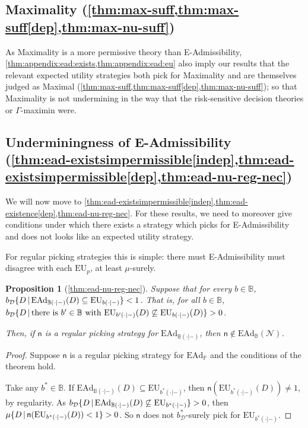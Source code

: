 \documentclass[a4paper]{article}
\newtheorem{proposition}[theorem]{Proposition}
\renewcommand\P{\mathbb{P}} %
\newcommand\EU{\mathrm{EU}}
\newcommand\EAd{\mathrm{EAd}}
\newcommand{\D}{\mathcal{D}}
\newcommand{\Decs}{\mathcal{D}}
\newcommand{\n}{\mathsf{n}}
\renewcommand{\nu}{\n}
\newcommand\Nu{\mathcal{N}}
\newcommand{\IB}{\mathbb{B}}
\newcommand{\IP}{\P}
\renewcommand{\color}[1]{}
\newenvironment{colored}[1]{\leavevmode\color{#1}}{}
\newcommand\SetDelimiter[1][]{
	\nonscript\,#1\vert \allowbreak \nonscript\,\mathopen{}}
\providecommand\given{\SetDelimiter}
\newenvironment{CCM rewritten}
{\begingroup\color{blue}} %
{\endgroup}              %
\begin{document}
\begin{colored}{violet}
\subsection{Maximality (\cref{thm:max-suff,thm:max-suff[dep],thm:max-nu-suff})}
As Maximality is a more permissive theory than E-Admissibility, \cref{thm:appendix:ead:exists,thm:appendix:ead:eu} also imply our results that the relevant expected utility strategies both pick for Maximality and are themselves judged as Maximal (\cref{thm:max-suff,thm:max-suff[dep],thm:max-nu-suff}); so that Maximality is not undermining in the way that the risk-sensitive decision theories or $\Gamma$-maximin were.

\subsection{Underminingness of E-Admissibility \\(\cref{thm:ead-existsimpermissible[indep],thm:ead-existsimpermissible[dep],thm:ead-nu-reg-nec})}\label{sect:appendix:eadundermining}

We will now move to \cref{thm:ead-existsimpermissible[indep],thm:ead-existence[dep],thm:ead-nu-reg-nec}. For these results, we need to moreover give conditions under which there exists a strategy which picks for E-Admissibility and does not looks like an expected utility strategy. 

For regular picking strategies this is simple: there must E-Admissibility must disagree with each $\EU_p$, at least $\mu$-surely.

	\begin{proposition}[\cref{thm:ead-nu-reg-nec}]
	Suppose that for every $b\in\IB$, $b_\D\{D\given \EAd_{\IB(\cdot|-)}(D)\subseteq\EU_{b(\cdot|-)}\}<1$. 
	That is, for all $b\in \IB$, $b_\D\{D\given \text{there is $b'\in\IB$ with }\EU_{b'(\cdot|-)}(D)\not\subseteq\EU_{b(\cdot|-)}(D)\}>0$. 
	
	Then, if $\n$ is a regular picking strategy for $\EAd_{\IB(\cdot|-)}$, then $\n\notin \EAd_\IB(\Nu)$.
\end{proposition}

\begin{proof}
	Suppose $\nu$ is a regular picking strategy for $\EAd_\IP$ and the conditions of the theorem hold. 
	
	Take any $b^*\in\IB$.
	If $\EAd_{\IB(\cdot|-)}(D)\subseteq\EU_{b^*(\cdot|-)}$, then $\nu(\EU_{b^*(\cdot|-)}(D))\neq 1$, by regularity. 
	As 
	$b_\D\{D\given \EAd_{\IB(\cdot|-)}(D)\not\subseteq\EU_{b^*(\cdot|-)}\}>0$, then $\mu\{D\given \nu(\EU_{b^*(\cdot|-)}(D))<1\}>0$.
	 So $\nu$ does not $b^*_\Decs$-surely pick for $\EU_{b^*(\cdot|-)}$. 
	 

\end{proof}
\end{colored}
\end{document}
